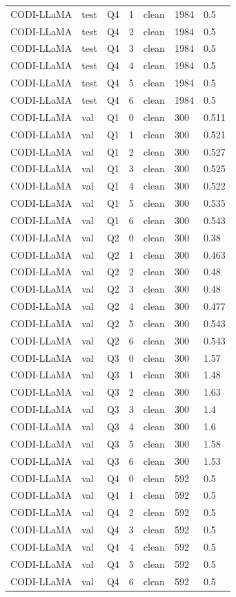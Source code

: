 \begin{longtable}{@{}p{}p{}p{}p{}p{}p{}p{}@{}}
CODI-LLaMA & test & Q4 & 1 & clean & 1984 & 0.5 \\
CODI-LLaMA & test & Q4 & 2 & clean & 1984 & 0.5 \\
CODI-LLaMA & test & Q4 & 3 & clean & 1984 & 0.5 \\
CODI-LLaMA & test & Q4 & 4 & clean & 1984 & 0.5 \\
CODI-LLaMA & test & Q4 & 5 & clean & 1984 & 0.5 \\
CODI-LLaMA & test & Q4 & 6 & clean & 1984 & 0.5 \\
CODI-LLaMA & val & Q1 & 0 & clean & 300 & 0.511 \\
CODI-LLaMA & val & Q1 & 1 & clean & 300 & 0.521 \\
CODI-LLaMA & val & Q1 & 2 & clean & 300 & 0.527 \\
CODI-LLaMA & val & Q1 & 3 & clean & 300 & 0.525 \\
CODI-LLaMA & val & Q1 & 4 & clean & 300 & 0.522 \\
CODI-LLaMA & val & Q1 & 5 & clean & 300 & 0.535 \\
CODI-LLaMA & val & Q1 & 6 & clean & 300 & 0.543 \\
CODI-LLaMA & val & Q2 & 0 & clean & 300 & 0.38 \\
CODI-LLaMA & val & Q2 & 1 & clean & 300 & 0.463 \\
CODI-LLaMA & val & Q2 & 2 & clean & 300 & 0.48 \\
CODI-LLaMA & val & Q2 & 3 & clean & 300 & 0.48 \\
CODI-LLaMA & val & Q2 & 4 & clean & 300 & 0.477 \\
CODI-LLaMA & val & Q2 & 5 & clean & 300 & 0.543 \\
CODI-LLaMA & val & Q2 & 6 & clean & 300 & 0.543 \\
CODI-LLaMA & val & Q3 & 0 & clean & 300 & 1.57 \\
CODI-LLaMA & val & Q3 & 1 & clean & 300 & 1.48 \\
CODI-LLaMA & val & Q3 & 2 & clean & 300 & 1.63 \\
CODI-LLaMA & val & Q3 & 3 & clean & 300 & 1.4 \\
CODI-LLaMA & val & Q3 & 4 & clean & 300 & 1.6 \\
CODI-LLaMA & val & Q3 & 5 & clean & 300 & 1.58 \\
CODI-LLaMA & val & Q3 & 6 & clean & 300 & 1.53 \\
CODI-LLaMA & val & Q4 & 0 & clean & 592 & 0.5 \\
CODI-LLaMA & val & Q4 & 1 & clean & 592 & 0.5 \\
CODI-LLaMA & val & Q4 & 2 & clean & 592 & 0.5 \\
CODI-LLaMA & val & Q4 & 3 & clean & 592 & 0.5 \\
CODI-LLaMA & val & Q4 & 4 & clean & 592 & 0.5 \\
CODI-LLaMA & val & Q4 & 5 & clean & 592 & 0.5 \\
CODI-LLaMA & val & Q4 & 6 & clean & 592 & 0.5 \\
\bottomrule
\end{longtable}
